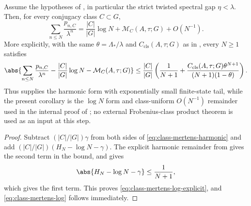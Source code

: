 \begin{corollary}
  \label{cor:class-mertens-log-form}
  Assume the hypotheses of , in particular
  the strict twisted spectral gap \(\eta<\lambda\).  Then, for every
  conjugacy class \(C\subset G\),
  \begin{equation}\label{eq:class-mertens-log}
    \sum_{n\le N}\frac{p_{n,C}}{\lambda^n}
    =
    \frac{|C|}{|G|}\log N+\mathcal M_C(A,\tau;G)+O(N^{-1}).
  \end{equation}
  More explicitly, with the same \(\theta=\Lambda_*/\lambda\) and
  \(C_{\mathrm{cls}}(A,\tau;G)\) as in
  , every \(N\ge1\) satisfies
  \begin{equation}\label{eq:class-mertens-log-explicit}
    \abs{
      \sum_{n\le N}\frac{p_{n,C}}{\lambda^n}
      -\frac{|C|}{|G|}\log N
      -\mathcal M_C(A,\tau;G)
    }
    \le
    \frac{|C|}{|G|}
    \left(
      \frac{1}{N+1}
      +
      \frac{
        C_{\mathrm{cls}}(A,\tau;G)\theta^{N+1}
      }{
        (N+1)(1-\theta)
      }
    \right).
  \end{equation}
  Thus  supplies the harmonic form with
  exponentially small finite-state tail, while the present corollary is the
  \(\log N\) form and class-uniform \(O(N^{-1})\) remainder used in the
  internal proof of ; no external
  Frobenius-class product theorem is used as an input at this step.
\end{corollary}

\begin{proof}
  Subtract \((|C|/|G|)\gamma\) from both sides of
  \eqref{eq:class-mertens-harmonic} and add
  \((|C|/|G|)(H_N-\log N-\gamma)\).  The explicit harmonic remainder from
   gives the second term in the bound, and
   gives
  \[
    \abs{H_N-\log N-\gamma}
    \le
    \frac{1}{N+1},
  \]
  which gives the first term.  This proves
  \eqref{eq:class-mertens-log-explicit}, and
  \eqref{eq:class-mertens-log} follows immediately.
\end{proof}

